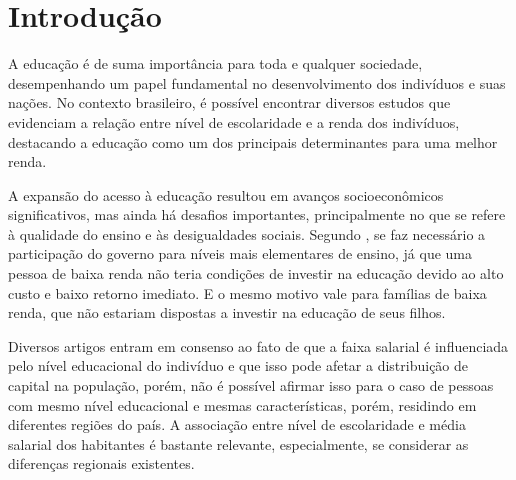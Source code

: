 \documentclass[12pt,a4paper,header]{abnt}
\begin{document}






\tableofcontents{}
\listoffigures
\listoftables



\chapter{Introdução} \label{cap:introducao}

A educação é de suma importância para toda e qualquer sociedade, desempenhando um papel fundamental no desenvolvimento dos indivíduos e suas nações. No contexto brasileiro, é possível encontrar diversos estudos que evidenciam a relação entre nível de escolaridade e a renda dos indivíduos, destacando a educação como um dos principais determinantes para uma melhor renda.


A expansão do acesso à educação resultou em avanços socioeconômicos significativos, mas ainda há desafios importantes, principalmente no que se refere à qualidade do ensino e às desigualdades sociais. Segundo , se faz necessário a participação do governo para níveis mais elementares de ensino, já que uma pessoa de baixa renda não teria condições de investir na educação devido ao alto custo e baixo retorno imediato. E o mesmo motivo vale para famílias de baixa renda, que não estariam dispostas a investir na educação de seus filhos.

Diversos artigos entram em consenso ao fato de que a faixa salarial é influenciada pelo nível educacional do indivíduo e que isso pode afetar a distribuição de capital na população, porém, não é possível afirmar isso para o caso de pessoas com mesmo nível educacional e mesmas características, porém, residindo em diferentes regiões do país. A associação entre nível de escolaridade e média salarial dos habitantes é bastante relevante, especialmente, se considerar as diferenças regionais existentes.
\end{document}
